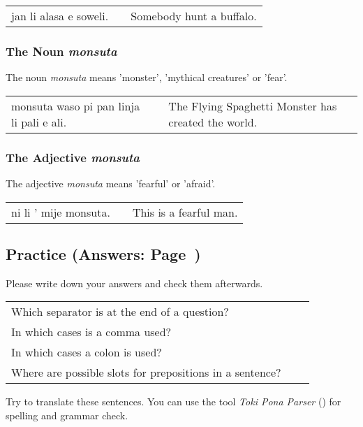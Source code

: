\begin{supertabular}{p{5,5cm}|ll}
    jan li alasa e soweli. &  & Somebody hunt a buffalo. \\
\end{supertabular}

\subsubsection*{The Noun \textit{monsuta}}
The noun \textit{monsuta} means 'monster', 'mythical creatures' or 'fear'.

\begin{supertabular}{p{5,5cm}|ll}
    monsuta waso pi pan linja li pali e ali. &  & The Flying Spaghetti Monster has created the world. \\
\end{supertabular}

\subsubsection*{The Adjective \textit{monsuta}}
The adjective \textit{monsuta} means 'fearful' or 'afraid'.

\begin{supertabular}{p{5,5cm}|ll}
    ni li ' mije monsuta. &  & This is a fearful man. \\
\end{supertabular}

\newpage

\subsection*{Practice (Answers: Page~\pageref{'living_things'})}
Please write down your answers and check them afterwards.

\begin{supertabular}{p{5,5cm}|ll}
    Which separator is at the end of a question?             &  & \\
    In which cases is a comma used?                          &  & \\
    In which cases a colon is used?                          &  & \\
    Where are possible slots for prepositions in a sentence? &  & \\
\end{supertabular}

Try to translate these sentences.
You can use the tool \textit{Toki Pona Parser} (\cite{www:rowa:02}) for spelling and grammar check.


